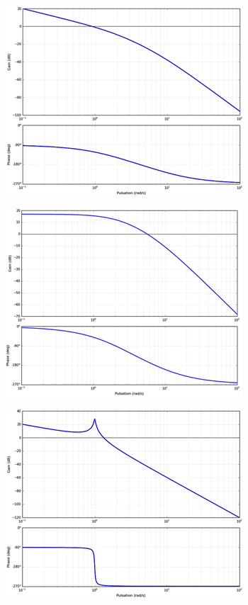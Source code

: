 \documentclass[10pt,fleqn]{article} %
\begin{document}
\begin{multicols}{2}
\begin{center}
\includegraphics[width=.9\linewidth]{images/im_03}
\end{center}

\begin{center}
\includegraphics[width=.9\linewidth]{images/im_04}
\end{center}

\begin{center}
\includegraphics[width=.9\linewidth]{images/im_05}
\end{center}



\end{multicols}
\end{document}

